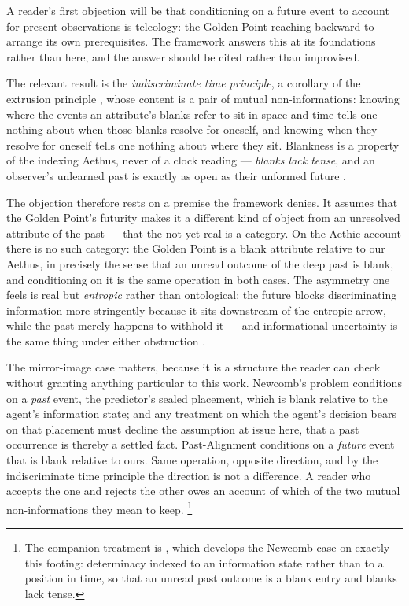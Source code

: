 \begin{remark}
\label{gc:rem:teleology}
A reader's first objection will be that conditioning on a future event
to account for present observations is teleology: the Golden Point
reaching backward to arrange its own prerequisites. The framework
answers this at its foundations rather than here, and the answer should
be cited rather than improvised.

The relevant result is the \emph{indiscriminate time principle}, a
corollary of the extrusion principle \cite{Aethus}, whose content is a
pair of mutual non-informations: knowing where the events an attribute's
blanks refer to sit in space and time tells one nothing about when those
blanks resolve for oneself, and knowing when they resolve for oneself
tells one nothing about where they sit. Blankness is a property of the
indexing Aethus, never of a clock reading --- \emph{blanks lack tense},
and an observer's unlearned past is exactly as open as their unformed
future \cite{AethusBrief}.

The objection therefore rests on a premise the framework denies. It
assumes that the Golden Point's futurity makes it a different kind of
object from an unresolved attribute of the past --- that the not-yet-real
is a category. On the Aethic account there is no such category: the
Golden Point is a blank attribute relative to our Aethus, in precisely
the sense that an unread outcome of the deep past is blank, and
conditioning on it is the same operation in both cases. The asymmetry
one feels is real but \emph{entropic} rather than ontological: the
future blocks discriminating information more stringently because it
sits downstream of the entropic arrow, while the past merely happens to
withhold it --- and informational uncertainty is the same thing under
either obstruction \cite{Aethus}.

The mirror-image case matters, because it is a structure the
reader can check without granting anything particular to this work.
Newcomb's problem conditions on a \emph{past} event, the predictor's
sealed placement, which is blank relative to the agent's information
state; and any treatment on which the agent's decision bears on that
placement must decline the assumption at issue here, that a past
occurrence is thereby a settled fact. Past-Alignment conditions on a
\emph{future} event that is blank relative to ours. Same operation,
opposite direction, and by the indiscriminate time principle the
direction is not a difference. A reader who accepts the one and rejects
the other owes an account of which of the two mutual non-informations
they mean to keep.%
\footnote{The companion treatment is \cite{AethusDecision}, which develops
the Newcomb case on exactly this footing: determinacy indexed to an
information state rather than to a position in time, so that an unread past
outcome is a blank entry and blanks lack tense.}


\end{remark}
